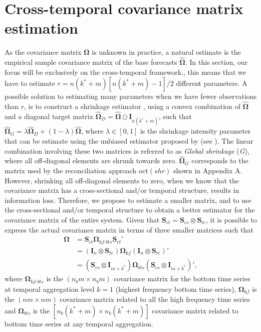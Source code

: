 \documentclass[12pt]{article}
\newcommand{\Ivet}{\bm{I}}
\newcommand{\Svet}{\bm{S}}
\newcommand{\Omegavet}{\bm{\Omega}}
\theoremstyle{definition}
\begin{document}
\section{Cross-temporal covariance matrix estimation}\label{sec:shrtech}

As the covariance matrix $\Omegavet$ is unknown in practice, a natural estimate is the empirical sample covariance matrix of the base forecasts $\widehat{\Omegavet}$. In this section, our focus will be exclusively on the cross-temporal framework., this means that we have to estimate $r = n(k^\ast+m)[n(k^\ast+m)-1]/2$ different parameters. A possible solution to estimating many parameters when we have fewer observations than $r$, is to construct a shrinkage estimator \citep{efron1975a,efron1975,efron1977}, using a convex combination of $\widehat{\Omegavet}$ and a diagonal target matrix $\widehat{\Omegavet}_D = \widehat{\Omegavet} \odot \Ivet_{n(k^\ast+m)}$, such that $\widehat{\Omegavet}_{G} = \lambda \widehat{\Omegavet}_D + (1-\lambda) \widehat{\Omegavet}$, where $\lambda \in [0,1]$ is the shrinkage intensity parameter that can be estimate using the unbiased estimator proposed by \cite{ledoit2004a} (see \citealp{schafer2005}). The linear combination involving these two matrices is referred to as \textit{Global shrinkage} (\textit{G}), where all off-diagonal elements are shrunk towards zero. $\widehat{\Omegavet}_{G}$ corresponds to the matrix used by the reconciliation approach oct$(shr)$ shown in Appendix A. However, shrinking all off-diagonal elements to zero, when we know that the covariance matrix has a cross-sectional and/or temporal structure, results in information loss. Therefore, we propose to estimate a smaller matrix, and to use the cross-sectional and/or temporal structure to obtain a better estimator for the covariance matrix of the entire system. Given that $\Svet_{ct} = \Svet_{cs} \otimes \Svet_{te}$, it is possible to express the actual covariance matrix in terms of three smaller matrices such that
\begin{equation}\label{eq:OmSct}
\begin{aligned}
	\Omegavet &= \Svet_{ct}\Omegavet_{\textit{hf-bts}}\Svet_{ct}' \\[-0.25cm]
	&= \left(\Ivet_n \otimes \Svet_{te}\right)\Omegavet_{\textit{hf}}\left(\Ivet_n \otimes \Svet_{te}\right)' \\[-0.25cm]
	&= \left(\Svet_{cs} \otimes \Ivet_{m+k^\ast}\right)\Omegavet_{bts}\left(\Svet_{cs} \otimes \Ivet_{m+k^\ast}\right)',
\end{aligned}
\end{equation}
where $\Omegavet_{\textit{hf-bts}}$ is the $(n_b m\times n_b m)$ covariance matrix for the bottom time series at temporal aggregation level $k = 1$ (highest frequency bottom time series), $\Omegavet_{\textit{hf}}$ is the $(nm\times nm)$ covariance matrix related to all the high frequency time series and $\Omegavet_{bts}$ is the $[n_b(k^\ast + m)\times n_b(k^\ast + m)]$ covariance matrix related to bottom time series at any temporal aggregation.
\end{document}
